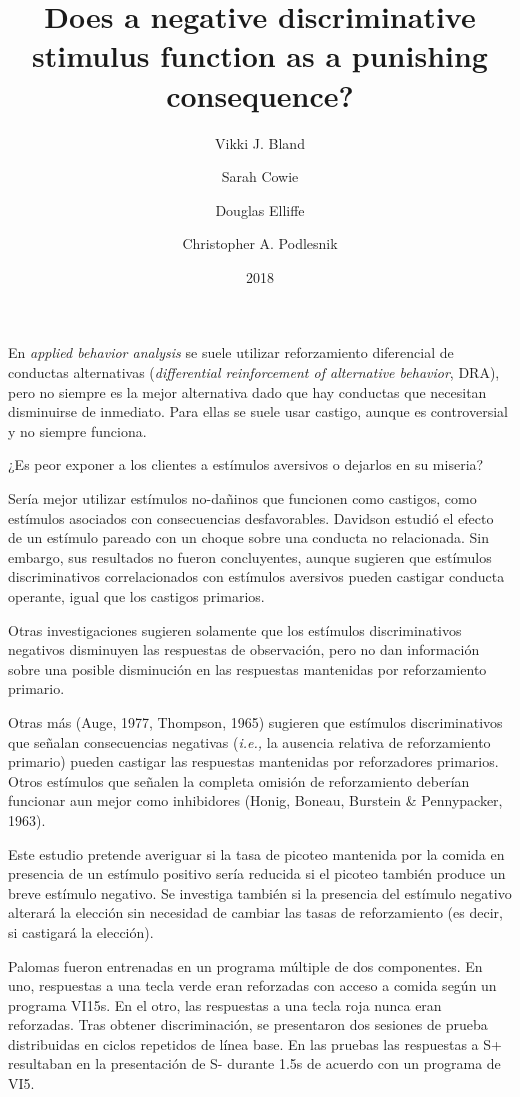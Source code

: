 \documentclass[a4paper,12pt]{article}
\title{Does a negative discriminative stimulus function as a punishing consequence?}
\author{Vikki J. Bland \and Sarah Cowie \and Douglas Elliffe \and Christopher A. Podlesnik}
\date{2018}
\begin{document}
{\scshape\bfseries \maketitle}

En {\itshape applied behavior analysis} se suele utilizar reforzamiento diferencial de conductas alternativas ({\itshape differential reinforcement of alternative behavior}, DRA), pero no siempre es la mejor alternativa dado que hay conductas que necesitan disminuirse de inmediato. Para ellas se suele usar castigo, aunque es controversial y no siempre funciona.

¿Es peor exponer a los clientes a estímulos aversivos o dejarlos en su miseria?

Sería mejor utilizar estímulos no-dañinos que funcionen como castigos, como estímulos asociados con consecuencias desfavorables. Davidson estudió el efecto de un estímulo pareado con un choque sobre una conducta no relacionada. Sin embargo, sus resultados no fueron concluyentes, aunque sugieren que estímulos discriminativos correlacionados con estímulos aversivos pueden castigar conducta operante, igual que los castigos primarios.

Otras investigaciones sugieren solamente que los estímulos discriminativos negativos disminuyen las respuestas de observación, pero no dan información sobre una posible disminución en las respuestas mantenidas por reforzamiento primario.

Otras más (Auge, 1977, Thompson, 1965) sugieren que estímulos discriminativos que señalan consecuencias negativas ({\itshape i.e.,} la ausencia relativa de reforzamiento primario) pueden castigar las respuestas mantenidas por reforzadores primarios. Otros estímulos que señalen la completa omisión de reforzamiento deberían funcionar aun mejor como inhibidores (Honig, Boneau, Burstein & Pennypacker, 1963).

Este estudio pretende averiguar si la tasa de picoteo mantenida por la comida en presencia de un estímulo positivo sería reducida si el picoteo también produce un breve estímulo negativo. Se investiga también si la presencia del estímulo negativo alterará la elección sin necesidad de cambiar las tasas de reforzamiento (es decir, si castigará la elección).

Palomas fueron entrenadas en un programa múltiple de dos componentes. En uno, respuestas a una tecla verde eran reforzadas con acceso a comida según un programa VI15s. En el otro, las respuestas a una tecla roja nunca eran reforzadas. Tras obtener discriminación, se presentaron dos sesiones de prueba distribuidas en ciclos repetidos de línea base. En las pruebas las respuestas a S+ resultaban en la presentación de S- durante 1.5s de acuerdo con un programa de VI5. 
\end{document}
